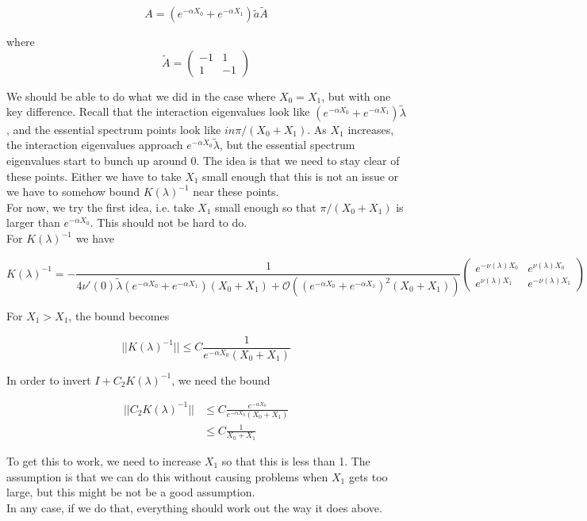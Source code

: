 \documentclass[12pt]{article}
\begin{document}
\[
A = (e^{-\alpha X_0} + e^{-\alpha X_1}) \tilde{a} \tilde{A}
\]

where
\[
\tilde{A} = \begin{pmatrix}
-1 & 1 \\
1 & -1
\end{pmatrix}
\]

We should be able to do what we did in the case where $X_0 = X_1$, but with one key difference. Recall that the interaction eigenvalues look like $(e^{-\alpha X_0} + e^{-\alpha X_1}) \tilde{\lambda}$, and the essential spectrum points look like $i n \pi / (X_0 + X_1)$. As $X_1$ increases, the interaction eigenvalues approach $e^{-\alpha X_0} \tilde{\lambda}$, but the essential spectrum eigenvalues start to bunch up around 0. The idea is that we need to stay clear of these points. Either we have to take $X_1$ small enough that this is not an issue or we have to somehow bound $K(\lambda)^{-1}$ near these points.\\

For now, we try the first idea, i.e. take $X_1$ small enough so that $\pi / (X_0 + X_1)$ is larger than $e^{-\alpha X_0}$. This should not be hard to do.\\

For $K(\lambda)^{-1}$ we have

\begin{equation}
K(\lambda)^{-1} = 
-\frac{1}{4 \nu'(0)\tilde{\lambda}(e^{-\alpha X_0} + e^{-\alpha X_1})(X_0 + X_1) + \mathcal{O}((e^{-\alpha X_0} + e^{-\alpha X_1})^2(X_0 + X_1))}
\begin{pmatrix}
e^{-\nu(\lambda)X_0} & e^{\nu(\lambda)X_0} \\
e^{\nu(\lambda)X_1} & e^{-\nu(\lambda)X_1}
\end{pmatrix}
\end{equation}

For $X_1 > X_1$, the bound becomes

\begin{equation}
|| K(\lambda)^{-1}|| \leq C \frac{1}{e^{-\alpha X_0}(X_0 + X_1)}
\end{equation}

In order to invert $I + C_2 K(\lambda)^{-1}$, we need the bound

\begin{align*}
|| C_2 K(\lambda)^{-1} || &\leq C \frac{ e^{-\alpha X_0} }{e^{-\alpha X_0}(X_0 + X_1)} \\
&\leq C \frac{1}{X_0 + X_1}
\end{align*}

To get this to work, we need to increase $X_1$ so that this is less than 1. The assumption is that we can do this without causing problems when $X_1$ gets too large, but this might be not be a good assumption. \\

In any case, if we do that, everything should work out the way it does above. 
\end{document}
